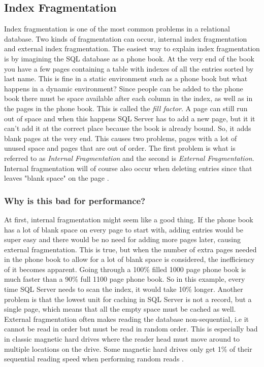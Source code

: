 \documentclass{cslthse-msc}
\begin{document}
\subsection{Index Fragmentation}
Index fragmentation is one of the most common problems in a relational database. Two kinds of fragmentation can occur, internal index fragmentation and external index fragmentation. The easiest way to explain index fragmentation is by imagining the SQL database as a phone book. At the very end of the book you have a few pages containing a table with indexes of all the entries sorted by last name. This is fine in a static environment such as a phone book but what happens in a dynamic environment?
Since people can be added to the phone book there must be space available after each column in the index, as well as in the pages in the phone book. This is called the \emph{fill factor}. A page can still run out of space and when this happens SQL Server has to add a new page, but it it can't add it at the correct place because the book is already bound. So, it adds blank pages at the very end. This causes two problems, pages with a lot of unused space and pages that are out of order. The first problem is what is referred to as \emph{Internal Fragmentation} and the second is \emph{External Fragmentation}. Internal fragmentation will of course also occur when deleting entries since that leaves "blank space" on the page \cite{Ozar12}.

\subsubsection{Why is this bad for performance?}
At first, internal fragmentation might seem like a good thing. If the phone book has a lot of blank space on every page to start with, adding entries would be super easy and there would be no need for adding more pages later, causing external fragmentation. This is true, but when the number of extra pages needed in the phone book to allow for a lot of blank space is considered, the inefficiency of it becomes apparent. Going through a 100\% filled 1000 page phone book is much faster than a 90\% full 1100 page phone book. So in this example, every time SQL Server needs to scan the index, it would take 10\% longer. Another problem is that the lowest unit for caching in SQL Server is not a record, but a single page, which means that all the empty space must be cached as well. \\

External fragmentation often makes reading the database non-sequential, i.e it cannot be read in order but must be read in random order. This is especially bad in classic magnetic hard drives where the reader head must move around to multiple locations on the drive. Some magnetic hard drives only get 1\% of their sequential reading speed when performing random reads \cite{Toshiba12}.
\end{document}
